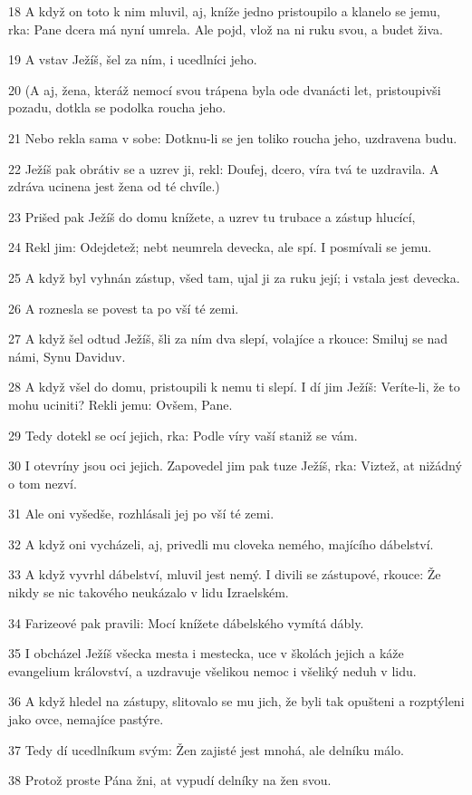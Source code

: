 \par 18 A když on toto k nim mluvil, aj, kníže jedno pristoupilo a klanelo se jemu, rka: Pane dcera má nyní umrela. Ale pojd, vlož na ni ruku svou, a budet živa.
\par 19 A vstav Ježíš, šel za ním, i ucedlníci jeho.
\par 20 (A aj, žena, kteráž nemocí svou trápena byla ode dvanácti let, pristoupivši pozadu, dotkla se podolka roucha jeho.
\par 21 Nebo rekla sama v sobe: Dotknu-li se jen toliko roucha jeho, uzdravena budu.
\par 22 Ježíš pak obrátiv se a uzrev ji, rekl: Doufej, dcero, víra tvá te uzdravila. A zdráva ucinena jest žena od té chvíle.)
\par 23 Prišed pak Ježíš do domu knížete, a uzrev tu trubace a zástup hlucící,
\par 24 Rekl jim: Odejdetež; nebt neumrela devecka, ale spí. I posmívali se jemu.
\par 25 A když byl vyhnán zástup, všed tam, ujal ji za ruku její; i vstala jest devecka.
\par 26 A roznesla se povest ta po vší té zemi.
\par 27 A když šel odtud Ježíš, šli za ním dva slepí, volajíce a rkouce: Smiluj se nad námi, Synu Daviduv.
\par 28 A když všel do domu, pristoupili k nemu ti slepí. I dí jim Ježíš: Veríte-li, že to mohu uciniti? Rekli jemu: Ovšem, Pane.
\par 29 Tedy dotekl se ocí jejich, rka: Podle víry vaší staniž se vám.
\par 30 I otevríny jsou oci jejich. Zapovedel jim pak tuze Ježíš, rka: Viztež, at nižádný o tom nezví.
\par 31 Ale oni vyšedše, rozhlásali jej po vší té zemi.
\par 32 A když oni vycházeli, aj, privedli mu cloveka nemého, majícího dábelství.
\par 33 A když vyvrhl dábelství, mluvil jest nemý. I divili se zástupové, rkouce: Že nikdy se nic takového neukázalo v lidu Izraelském.
\par 34 Farizeové pak pravili: Mocí knížete dábelského vymítá dábly.
\par 35 I obcházel Ježíš všecka mesta i mestecka, uce v školách jejich a káže evangelium království, a uzdravuje všelikou nemoc i všeliký neduh v lidu.
\par 36 A když hledel na zástupy, slitovalo se mu jich, že byli tak opušteni a rozptýleni jako ovce, nemajíce pastýre.
\par 37 Tedy dí ucedlníkum svým: Žen zajisté jest mnohá, ale delníku málo.
\par 38 Protož proste Pána žni, at vypudí delníky na žen svou.

